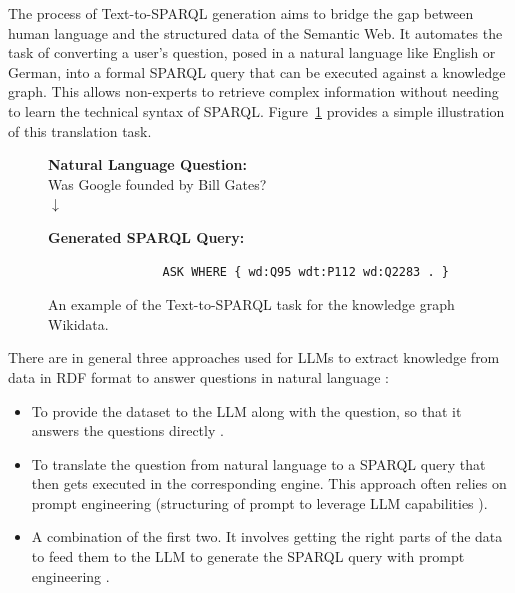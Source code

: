 The process of Text-to-SPARQL generation aims to bridge the gap between human language and the structured data of the Semantic Web. It automates the task of converting a user's question, posed in a natural language like English or German, into a formal SPARQL query that can be executed against a knowledge graph. 
This allows non-experts to retrieve complex information without needing to learn the technical syntax of SPARQL. Figure~\ref{fig:text_to_sparql_example} provides a simple illustration of this translation task.

\begin{figure}[h!]
\centering 
\textbf{Natural Language Question:} \\[0.5em]
Was Google founded by Bill Gates?
\\[1em]
$\downarrow$
\\[1em]

\begin{minipage}{\linewidth}
\centering
\textbf{Generated SPARQL Query:}
\begin{verbatim}
                ASK WHERE { wd:Q95 wdt:P112 wd:Q2283 . }
\end{verbatim}
\end{minipage}

\caption{An example of the Text-to-SPARQL task for the knowledge graph Wikidata.}
\label{fig:text_to_sparql_example}
\end{figure}

There are in general three approaches used for LLMs to extract knowledge from data in RDF format to answer questions in natural language \cite{avila2024experiments}:

\begin{itemize}
  \item To provide the dataset to the LLM along with the question, so that it answers the questions directly \cite{avila2024experiments}.
  \item To translate the question from natural language to a SPARQL query that then gets executed in the corresponding engine. This approach often relies on prompt engineering \cite{zahera2024generating} (structuring of prompt to leverage LLM capabilities \cite{aws_prompt_engineering}).
  \item A combination of the first two. It involves getting the right parts of the data to feed them to the LLM to generate the SPARQL query with prompt engineering \cite{emonet2024llm}.
\end{itemize}